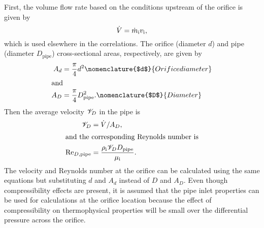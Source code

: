 First, the volume flow rate based on the conditions 
upstream of the orifice is given by
\begin{equation}
  \dot{V} = \dot{m}_{\text{i}}v_{\text{i}},
\end{equation}
which is used elsewhere in the correlations.
The orifice (diameter $d$) and 
pipe (diameter $D_{\text{pipe}}$) cross-sectional areas, 
respectively, are given by
\begin{align}
  A_d &= \frac{\pi}{4} d^2 
  \nomenclature{$d$}{Orifice diameter\nomunit{\foot,\,\inch}} \\
  \shortintertext{and}
  A_D &= \frac{\pi}{4} D_{\text{pipe}}^2.
  \nomenclature{$D$}{Diameter\nomunit{\foot,\,\inch}}
\end{align}
Then  the average velocity $\mathscr{V}_D$ in the pipe is
\begin{align}
  \mathscr{V}_D &= \dot{V}/A_D, \\
  \intertext{and the corresponding Reynolds number is}
  \mathrm{Re}_{D,\text{pipe}} &= \frac{\rho_{\text{i}} \mathscr{V}_D D_{\text{pipe}}}{\mu_{\text{i}}}.
\end{align}
The velocity and Reynolds number at the orifice can be calculated using 
the same equations but substituting $d$ and $A_d$ instead of $D$ and $A_D$.
Even though compressibility effects are present, it is assumed that the pipe inlet properties
can be used for calculations at the orifice location because the effect of compressibility
on thermophysical properties will be small over the differential pressure across the orifice.

